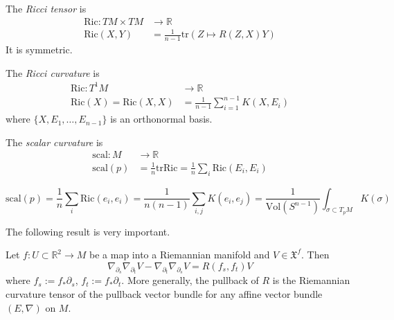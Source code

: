 \documentclass{book}
\begin{document}
The {\it Ricci tensor} is
\begin{equation}
\label{equation-Ricci-tensor}
\begin{aligned}
\text{Ric}: TM\times TM &\longrightarrow
\mathbb{R} \\
\text{Ric}(X,Y)&=\frac{1}{n-1}\text{tr}
(Z\mapsto
R(Z,X)Y)
\end{aligned}
\end{equation}
It is symmetric.

The {\it Ricci curvature} is
\begin{equation}
\label{equation-Ricci-curvature}
\begin{aligned}
\text{Ric}: T^1M &\longrightarrow \mathbb{R}
\\
\text{Ric}(X)=\text{Ric}(X,X)&=\frac{1}{n-1}
\sum_{i=1}^{n-1}K(X,E_i)
\end{aligned}
\end{equation}
where $\{X,E_1,\ldots,E_{n-1}\}$ is an
orthonormal basis.

The {\it scalar curvature} is
\begin{equation}
\label{equation-scalar-curvature}
\begin{aligned}
\text{scal}: M &\longrightarrow \mathbb{R} \\
\text{scal}(p)&=\frac{1}{n}\text{tr}
\text{Ric}
=\frac{1}{n}\sum_i\text{Ric}(E_i,E_i)
\end{aligned}
\end{equation}

\begin{lemma}
\label{lemma-scala-curva-mean-secti}
$$
\text{scal}(p)=\frac{1}{n}\sum_{i}\text{Ric}
(e_i,e_i)
=\frac{1}{n(n-1)}\sum_{i,j}K(e_i,e_j)
=\frac{1}{\text{Vol}(S^{n-1})}
\int_{\sigma\subset
T_pM}K(\sigma)
$$
\end{lemma}

\medskip\noindent
The following result is very important.

\begin{lemma}
\label{lemma-symmetry-lemma-curvature}
Let $f:U \subset \mathbb{R}^2 \to M$
be a map into a Riemannian manifold and $V
\in \mathfrak{X}^f$.
Then
$$
\nabla_{\partial_s}\nabla_{\partial_t}V
-\nabla_{\partial_t}\nabla_{\partial_s}V
=R(f_s,f_t)V
$$
where $f_s:=f_*\partial_s$,
$f_t:=f_*\partial_t$.
More generally, the pullback of $R$ is the
Riemannian curvature tensor of the pullback
vector bundle
for any affine vector bundle $(E,\nabla)$ on
$M$.
\end{lemma}
\end{document}

